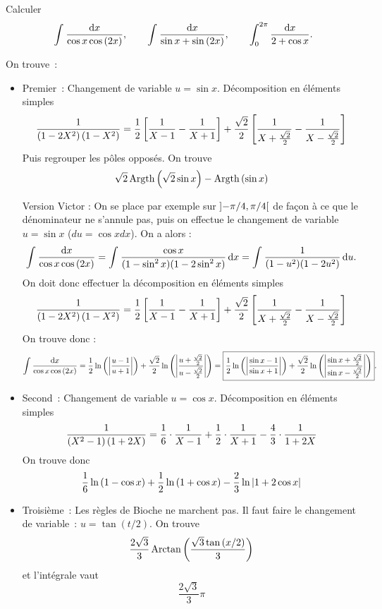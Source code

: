 \documentclass{magnolia}
\begin{document}
\begin{exoUnique}
\exo Calculer
  \[\priminv{\cos x\cos\p{2x}}{x}, \qquad \priminv{\sin x+\sin\p{2x}}{x},
    \qquad \integinv{0}{2\pi}{2+\cos x}{x}.\]
  \begin{sol}
  On trouve~:
  \begin{itemize}
  \item Premier~: Changement de variable $u=\sin x$.
    Décomposition en éléments simples
    \[\frac{1}{\p{1-2X^2}\p{1-X^2}}=\frac{1}{2}\cro{\frac{1}{X-1}-\frac{1}{X+1}}+
      \frac{\sqrt{2}}{2}\cro{\frac{1}{X+\frac{\sqrt{2}}{2}}-
      \frac{1}{X-\frac{\sqrt{2}}{2}}}\]
    Puis regrouper les pôles opposés. On trouve
    \[\sqrt{2}\argth\p{\sqrt{2}\sin x}-\argth\p{\sin x}\]
    
    Version Victor :
    On se place par exemple sur $\intero{-\pi/4}{\pi/4}$ de façon à ce que le dénominateur ne s'annule pas, puis on effectue le changement de variable $u=\sin x$ ($du=\cos x dx$). On a alors :
$$\priminv{\cos x\cos\p{2x}}{x}=\prim{\frac{\cos x}{(1-\sin^2 x)(1-2\sin^2 x)}}{x}=\prim{\frac{1}{(1-u^2)(1-2u^2)}}{u}.$$ On doit donc effectuer la décomposition en éléments simples
    \[\frac{1}{\p{1-2X^2}\p{1-X^2}}=\frac{1}{2}\cro{\frac{1}{X-1}-\frac{1}{X+1}}+
      \frac{\sqrt{2}}{2}\cro{\frac{1}{X+\frac{\sqrt{2}}{2}}-
      \frac{1}{X-\frac{\sqrt{2}}{2}}}\]
    On trouve donc :
    \[\priminv{\cos x\cos\p{2x}}{x}=\frac{1}{2}\ln\p{\abs{\frac{u-1}{u+1}}}+
      \frac{\sqrt{2}}{2}\ln\p{\abs{\frac{u+\frac{\sqrt{2}}{2}}{u-\frac{\sqrt{2}}{2}}}}=\boxed{\frac{1}{2}\ln\p{\abs{\frac{\sin x-1}{\sin x+1}}}+
      \frac{\sqrt{2}}{2}\ln\p{\abs{\frac{\sin x+\frac{\sqrt{2}}{2}}{\sin x-\frac{\sqrt{2}}{2}}}}} .\]
  \item Second~: Changement de variable $u=\cos x$. Décomposition en éléments
    simples
    \[\frac{1}{\p{X^2-1}\p{1+2X}}=\frac{1}{6}\cdot\frac{1}{X-1}+
      \frac{1}{2}\cdot\frac{1}{X+1}-\frac{4}{3}\cdot\frac{1}{1+2X}\]
    On trouve donc
    \[\frac{1}{6}\ln\p{1-\cos x}+\frac{1}{2}\ln\p{1+\cos x}-\frac{2}{3}
      \ln\abs{1+2\cos x}\]
  \item Troisième~: Les règles de Bioche ne marchent pas. Il faut
    faire le changement de variable~: $u=\tan(t/2)$. On trouve
    \[\frac{2\sqrt{3}}{3}\arctan\p{\frac{\sqrt{3}\tan\p{x/2}}{3}}\]
    et l'intégrale vaut
    \[\frac{2\sqrt{3}}{3}\pi\]
    

\end{itemize}
\end{sol}
\end{exoUnique}
\end{document}
